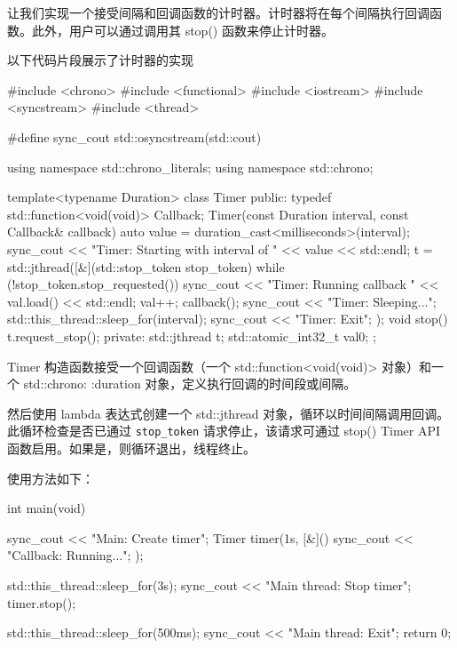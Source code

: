 

让我们实现一个接受间隔和回调函数的计时器。计时器将在每个间隔执行回调函数。此外，用户可以通过调用其 stop() 函数来停止计时器。

以下代码片段展示了计时器的实现

\begin{cpp}
#include <chrono>
#include <functional>
#include <iostream>
#include <syncstream>
#include <thread>

#define sync_cout std::osyncstream(std::cout)

using namespace std::chrono_literals;
using namespace std::chrono;

template<typename Duration>
class Timer {
    public:
    typedef std::function<void(void)> Callback;
    Timer(const Duration interval,
          const Callback& callback) {
        auto value = duration_cast<milliseconds>(interval);
        sync_cout << "Timer: Starting with interval of "
                  << value << std::endl;
        t = std::jthread([&](std::stop_token stop_token) {
            while (!stop_token.stop_requested()) {
                sync_cout << "Timer: Running callback "
                          << val.load() << std::endl;
                val++;
                callback();
                sync_cout << "Timer: Sleeping...\n";
                std::this_thread::sleep_for(interval);
            }
            sync_cout << "Timer: Exit\n";
        });
    }
    void stop() {
        t.request_stop();
    }
    private:
    std::jthread t;
    std::atomic_int32_t val{0};
};
\end{cpp}

Timer 构造函数接受一个回调函数（一个 std::function<void(void)> 对象）和一个 std::chrono: :duration 对象，定义执行回调的时间段或间隔。

然后使用 lambda 表达式创建一个 std::jthread 对象，循环以时间间隔调用回调。此循环检查是否已通过 \verb|stop_token| 请求停止，该请求可通过 stop() Timer API 函数启用。如果是，则循环退出，线程终止。

使用方法如下：

\begin{cpp}
int main(void) {
    sync_cout << "Main: Create timer\n";
    Timer timer(1s, [&]() {
        sync_cout << "Callback: Running...\n";
    });

    std::this_thread::sleep_for(3s);
    sync_cout << "Main thread: Stop timer\n";
    timer.stop();

    std::this_thread::sleep_for(500ms);
    sync_cout << "Main thread: Exit\n";
    return 0;
}
\end{cpp}

